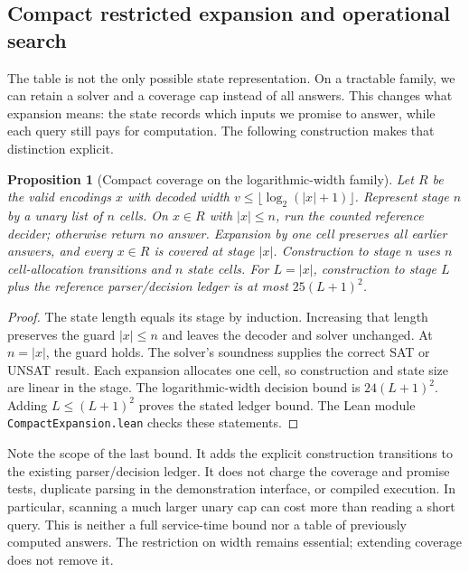 \documentclass[11pt,a4paper]{article}
\numberwithin{equation}{section}
\theoremstyle{plain}
\newtheorem{proposition}[lemma]{Proposition}
\theoremstyle{definition}
\theoremstyle{remark}
\begin{document}
\subsection{Compact restricted expansion and operational search}
\label{sec:compact-expansion}

The table is not the only possible state representation. On a tractable family, we can retain a solver and a coverage cap instead of all answers. This changes what expansion means: the state records which inputs we promise to answer, while each query still pays for computation. The following construction makes that distinction explicit.

\begin{proposition}[Compact coverage on the logarithmic-width family]
\label{prop:compact-coverage}
Let $R$ be the valid encodings $x$ with decoded width $v\leq\lfloor\log_2(|x|+1)\rfloor$. Represent stage $n$ by a unary list of $n$ cells. On $x\in R$ with $|x|\leq n$, run the counted reference decider; otherwise return no answer. Expansion by one cell preserves all earlier answers, and every $x\in R$ is covered at stage $|x|$. Construction to stage $n$ uses $n$ cell-allocation transitions and $n$ state cells. For $L=|x|$, construction to stage $L$ plus the reference parser/decision ledger is at most $25(L+1)^2$.
\end{proposition}

\begin{proof}
The state length equals its stage by induction. Increasing that length preserves the guard $|x|\leq n$ and leaves the decoder and solver unchanged. At $n=|x|$, the guard holds. The solver's soundness supplies the correct SAT or UNSAT result. Each expansion allocates one cell, so construction and state size are linear in the stage. The logarithmic-width decision bound is $24(L+1)^2$. Adding $L\leq(L+1)^2$ proves the stated ledger bound. The Lean module \texttt{CompactExpansion.lean} checks these statements.
\end{proof}

Note the scope of the last bound. It adds the explicit construction transitions to the existing parser/decision ledger. It does not charge the coverage and promise tests, duplicate parsing in the demonstration interface, or compiled execution. In particular, scanning a much larger unary cap can cost more than reading a short query. This is neither a full service-time bound nor a table of previously computed answers. The restriction on width remains essential; extending coverage does not remove it.
\end{document}
